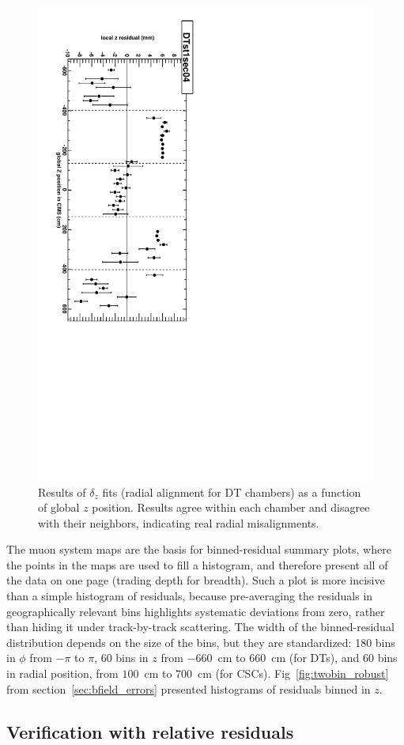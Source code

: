 \documentclass[12pt]{article}
\begin{document}
\begin{figure}
\includegraphics[height=\linewidth, angle=90]{examplemap_DATAzpos.pdf}
\caption{Results of $\delta_z$ fits (radial alignment for DT chambers) as a function of global $z$ position.  Results agree within each chamber and disagree with their neighbors, indicating real radial misalignments. \label{fig:examplemap_zpos}}
\end{figure}

The muon system maps are the basis for binned-residual summary plots,
where the points in the maps are used to fill a histogram, and
therefore present all of the data on one page (trading depth for
breadth).  Such a plot is more incisive than a simple histogram of
residuals, because pre-averaging the residuals in geographically
relevant bins highlights systematic deviations from zero, rather than
hiding it under track-by-track scattering.  The width of the
binned-residual distribution depends on the size of the bins, but they
are standardized: 180 bins in $\phi$ from $-\pi$ to $\pi$, 60 bins in
$z$ from $-660$~cm to $660$~cm (for DTs), and 60 bins in radial
position, from $100$~cm to $700$~cm (for CSCs).
Fig~\ref{fig:twobin_robust} from section~\ref{sec:bfield_errors}
presented histograms of residuals binned in $z$.

\subsection{Verification with relative residuals}
\end{document}
